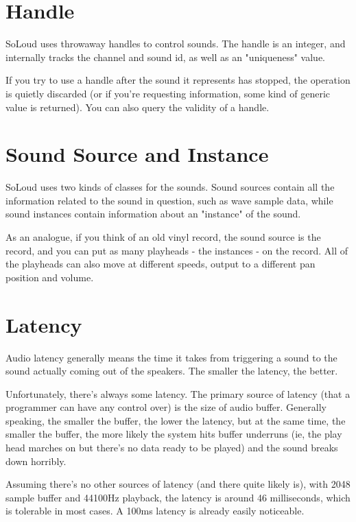 \section{Handle}

SoLoud uses throwaway handles to control sounds. The handle is an integer, and internally tracks the channel and sound id, as well as an "uniqueness" value.

If you try to use a handle after the sound it represents has stopped, the operation is quietly discarded (or if you're requesting information, some kind of generic value is returned). You can also query the validity of a handle.

\section{Sound Source and Instance}

SoLoud uses two kinds of classes for the sounds. Sound sources contain all the information related to the sound in question, such as wave sample data, while sound instances contain information about an "instance" of the sound.

As an analogue, if you think of an old vinyl record, the sound source is the record, and you can put as many playheads - the instances - on the record. All of the playheads can also move at different speeds, output to a different pan position and volume.

\section{Latency}

Audio latency generally means the time it takes from triggering a sound to the sound actually coming out of the speakers. The smaller the latency, the better.

Unfortunately, there's always some latency. The primary source of latency (that a programmer can have any control over) is the size of audio buffer. Generally speaking, the smaller the buffer, the lower the latency, but at the same time, the smaller the buffer, the more likely the system hits buffer underruns (ie, the play head marches on but there's no data ready to be played) and the sound breaks down horribly.

Assuming there's no other sources of latency (and there quite likely is), with 2048 sample buffer and 44100Hz playback, the latency is around 46 milliseconds, which is tolerable in most cases. A 100ms latency is already easily noticeable.


